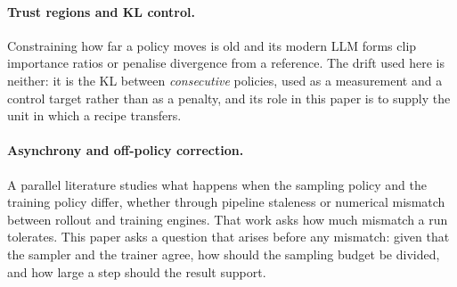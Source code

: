 \paragraph{Trust regions and KL control.} Constraining how far a policy moves is old
\citep{schulman2015trpo, schulman2017ppo} and its modern LLM forms clip importance ratios or
penalise divergence from a reference. The drift used here is neither: it is the KL between
\emph{consecutive} policies, used as a measurement and a control target rather than as a penalty,
and its role in this paper is to supply the unit in which a recipe transfers.

\paragraph{Asynchrony and off-policy correction.} A parallel literature studies what happens when
the sampling policy and the training policy differ, whether through pipeline staleness
\citep{song2026staleness} or numerical mismatch between rollout and training engines. That work
asks how much mismatch a run tolerates. This paper asks a question that arises before any mismatch:
given that the sampler and the trainer agree, how should the sampling budget be divided, and how
large a step should the result support.
